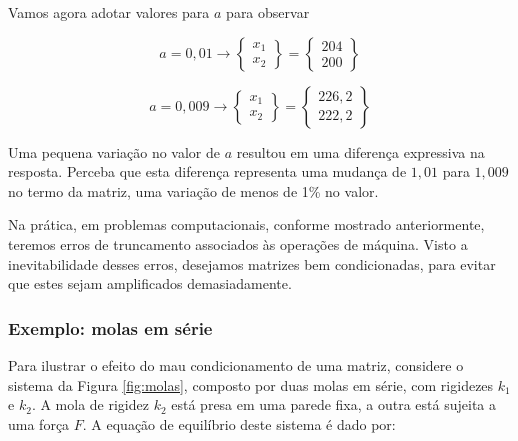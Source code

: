         Vamos agora adotar valores para $a$ para observar 

        \begin{equation}
            a =0,01
            \rightarrow
            \begin{Bmatrix}
                x_1\\
                x_2
            \end{Bmatrix}
            =
            \begin{Bmatrix}
                204\\
                200
            \end{Bmatrix}
        \end{equation}

        \begin{equation}
            a =0,009
            \rightarrow
            \begin{Bmatrix}
                x_1\\
                x_2
            \end{Bmatrix}
            =
            \begin{Bmatrix}
                226,2\\
                222,2
            \end{Bmatrix}
        \end{equation}

        Uma pequena variação no valor de $a$ resultou em uma diferença expressiva na resposta. Perceba que esta diferença representa uma mudança de $1,01$ para $1,009$ no termo da matriz, uma variação de menos de 1\% no valor.

        Na prática, em problemas computacionais, conforme mostrado anteriormente, teremos erros de truncamento associados às operações de máquina. Visto a inevitabilidade desses erros, desejamos matrizes bem condicionadas, para evitar que estes sejam amplificados demasiadamente.

        \subsubsection*{Exemplo: molas em série}

            Para ilustrar o efeito do mau condicionamento de uma matriz, considere o sistema da Figura \ref{fig:molas}, composto por duas molas em série, com rigidezes $k_1$ e $k_2$. A mola de rigidez $k_2$ está presa em uma parede fixa, a outra está sujeita a uma força $F$. A equação de equilíbrio deste sistema é dado por:

